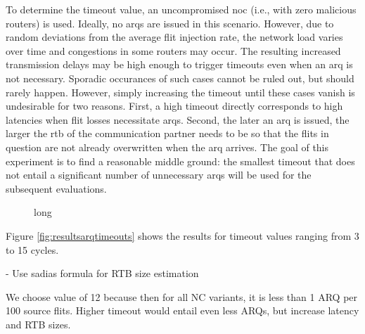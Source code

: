 To determine the timeout value, an uncompromised \gls{noc} (i.e., with zero malicious routers) is used. Ideally, no \glspl{arq} are issued in this
scenario. However, due to random deviations from the average flit injection rate, the network load varies over time and congestions in some routers
may occur. The resulting increased transmission delays may be high enough to trigger timeouts even when an \gls{arq} is not necessary. Sporadic
occurances of such cases cannot be ruled out, but should rarely happen. However, simply increasing the timeout until these cases vanish is undesirable
for two reasons. First, a high timeout directly corresponds to high latencies when flit losses necessitate \glspl{arq}. Second, the later an \gls{arq}
is issued, the larger the \gls{rtb} of the communication partner needs to be so that the flits in question are not already overwritten when the
\gls{arq} arrives. The goal of this experiment is to find a reasonable middle ground: the smallest timeout that does not entail a significant number of
unnecessary \glspl{arq} will be used for the subsequent evaluations.

\begin{figure}
    \centering
    
    \caption[Results for ARQ timeouts experiment]{long}
    \label{fig:resultsarqtimeouts}
\end{figure}

Figure \vref{fig:resultsarqtimeouts} shows the results for timeout values ranging from 3 to 15 cycles.

- Use sadias formula for RTB size estimation

We choose value of 12 because then for all NC variants, it is less than 1 ARQ per 100 source flits. Higher timeout would entail even less ARQs, but
increase latency and RTB sizes.

